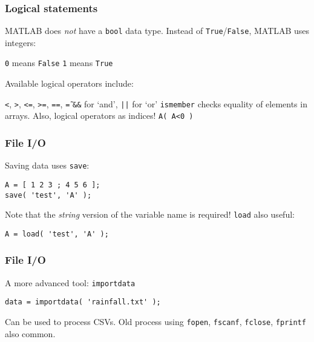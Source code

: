 \documentclass[11pt]{beamer}
\begin{document}
\begin{frame}[fragile]
  \frametitle{Logical statements}
  \Enlarge

  \begin{itemize}
  \myitem  MATLAB does \emph{not} have a \texttt{bool} data type. \pause
  \myitem  Instead of \texttt{True}/\texttt{False}, MATLAB uses integers:
    \begin{itemize}
    \mysubitem  \texttt{0} means \texttt{False}
    \mysubitem  \texttt{1} means \texttt{True}
    \end{itemize}
  \pause
  \myitem  Available logical operators include:
    \begin{itemize}
    \mysubitem  \texttt{<}, \texttt{>}, \texttt{<=}, \texttt{>=}, \texttt{==}, \texttt{\~=}
    \mysubitem  \texttt{\&\&} for `and', \texttt{||} for `or'
    \mysubitem  \texttt{ismember} checks equality of elements in arrays.
    \mysubitem  Also, logical operators as indices! \pause
    \mysubitem  \texttt{A( A<0 )}
    \end{itemize}
  \end{itemize}
\end{frame}

\begin{frame}[fragile]
  \frametitle{File I/O}
  \Enlarge

  \begin{enumerate}
  \myitem  Saving data uses \texttt{save}:
  \end{enumerate}
  \begin{Verbatim}
A = [ 1 2 3 ; 4 5 6 ];
save( 'test', 'A' );
  \end{Verbatim}
  \pause
  \begin{enumerate}
  \myitem  Note that the \emph{string} version of the variable name is required!
  \myitem  \texttt{load} also useful:
  \end{enumerate}
  \begin{Verbatim}
A = load( 'test', 'A' );
  \end{Verbatim}
\end{frame}

\begin{frame}[fragile]
  \frametitle{File I/O}
  \Enlarge

  \begin{enumerate}
  \myitem  A more advanced tool:  \texttt{importdata}
  \end{enumerate}
  \begin{Verbatim}
data = importdata( 'rainfall.txt' );
  \end{Verbatim}
  \pause
  \begin{enumerate}
  \myitem  Can be used to process CSVs.  \pause
  \myitem  Old process using \texttt{fopen}, \texttt{fscanf}, \texttt{fclose}, \texttt{fprintf} also common.
  \end{enumerate}
\end{frame}
\end{document}
